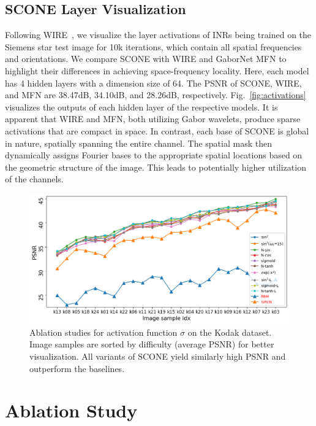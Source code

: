 \documentclass[letterpaper]{article} %
\begin{document}
\subsection{SCONE Layer Visualization}
\label{subsec:mask_visual}
Following WIRE~\cite{saragadam2023wire}, we visualize the layer activations of INRs being trained on the Siemens star test image for 10k iterations, which contain all spatial frequencies and orientations. We compare SCONE with WIRE and GaborNet MFN to highlight their differences in achieving space-frequency locality. Here, each model has 4 hidden layers with a dimension size of 64. The PSNR of SCONE, WIRE, and MFN are 38.47dB, 34.10dB, and 28.26dB, respectively. Fig.~\ref{fig:activations} visualizes the outputs of each hidden layer of the respective models. It is apparent that WIRE and MFN, both utilizing Gabor wavelets, produce sparse activations that are compact in space. In contrast, each base of SCONE is global in nature, spatially spanning the entire channel. The spatial mask then dynamically assigns Fourier bases to the appropriate spatial locations based on the geometric structure of the image. This leads to potentially higher utilization of the channels.

\begin{figure}[ht]
    \centering
    \includegraphics[width=1\columnwidth]{Figures/act_psnr.png}
    \caption{Ablation studies for activation function $\sigma$ on the Kodak dataset. Image samples are sorted by difficulty (average PSNR) for better visualization. All variants of SCONE yield similarly high PSNR and outperform the baselines.}
    \label{fig:act_psnr}
\end{figure}

\section{Ablation Study}
\label{subsec:ablation}
\end{document}
